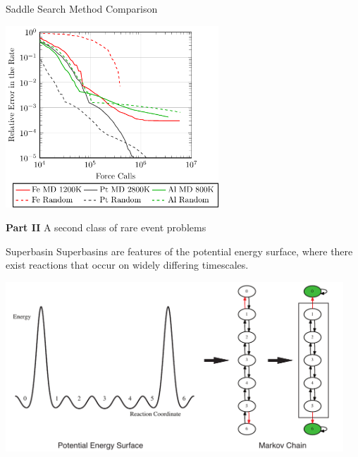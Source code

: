 \documentclass[onlymath]{beamer}
\begin{document}
\begin{frame}{Saddle Search Method Comparison}

\begin{center}
\includegraphics[width=0.6\textwidth]{images/saddle-search-comparison.pdf}
\end{center}

\end{frame}

\begin{frame}{\textbf{Part II} A second class of rare event problems}
  \begin{block}{Superbasin}
    Superbasins are features of the potential energy surface, where there exist reactions that occur on widely differing timescales.
  \end{block}

  \begin{center}
    \includegraphics[width=0.95\textwidth]{images/superbasin-and-graphs}
  \end{center}


\end{frame}
\end{document}
